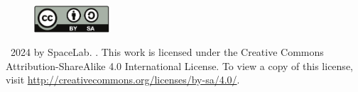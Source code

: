 \vfill

\begin{figure}[!h]
	\begin{center}
		\includegraphics[width=0.25\textwidth]{figures/by-sa.pdf}
	\end{center}
\end{figure}

\textcopyright\  2024 by SpaceLab. \thetitle. This work is licensed under the Creative Commons Attribution-ShareAlike 4.0 International License. To view a copy of this license, visit \href{http://creativecommons.org/licenses/by-sa/4.0/}{http://creativecommons.org/licenses/by-sa/4.0/}.
